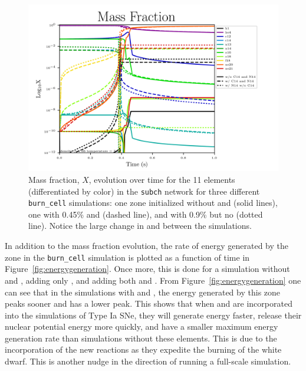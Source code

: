 \documentclass[preprint]{aastex62}
\begin{document}
      \begin{figure}
        \centering
        \includegraphics[width=6in]{images/subch_nC14nN14_xn_tol-10.png}
        \caption{Mass fraction, $X$, evolution over time for the 11 elements (differentiated by color) in the {\tt subch} network for three different {\tt burn\_cell} simulations: one zone initialized without  and  (solid lines), one with 0.45\%  and  (dashed line), and with 0.9\%  but no  (dotted line). Notice the large change in  and  between the simulations.
          }
        \label{fig:microphysicsX}
      \end{figure} 
      
      In addition to the mass fraction evolution, the rate of energy generated by the zone in the {\tt burn\_cell} simulation is plotted as a function of time in Figure~\ref{fig:energygeneration}. Once more, this is done for a simulation without  and , adding only , and adding both  and . From Figure~\ref{fig:energygeneration} one can see that in the simulations with  and , the energy generated by this zone peaks sooner and has a lower peak.  This shows that when  and  are incorporated into the simulations of Type Ia SNe, they will generate energy faster, release their nuclear potential energy more quickly, and have a smaller maximum energy generation rate than simulations without these elements. This is due to the incorporation of the new reactions as they expedite the burning of the white dwarf. This is another nudge in the direction of running a full-scale simulation. 
      
\end{document}
